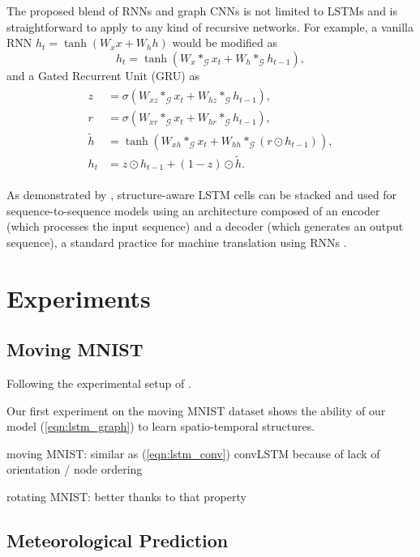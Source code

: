 \documentclass{article} %
\newcommand{\G}{\mathcal{G}}
\newcommand{\eqnref}[1]{(\ref{eqn:#1})}
\begin{document}
The proposed blend of RNNs and graph CNNs is not limited to LSTMs and is
straightforward to apply to any kind of recursive networks. For example, a
vanilla RNN $h_t = \tanh(W_x x + W_h h)$ would be modified as
\begin{equation} \label{eqn:vrnn_graph}
	h_t = \tanh(W_x \ast_\G x_t + W_h \ast_\G h_{t-1}),
\end{equation}
and a Gated Recurrent Unit (GRU) \citep{gru} as
\begin{align} \label{eqn:gru_graph}
\begin{split}
	z &= \sigma(W_{xz} \ast_\G x_t + W_{hz} \ast_\G h_{t-1}), \\
	r &= \sigma(W_{xr} \ast_\G x_t + W_{hr} \ast_\G h_{t-1}), \\
	\tilde{h} &= \tanh(W_{xh} \ast_\G x_t + W_{hh} \ast_\G (r \odot h_{t-1})), \\
	h_t &= z \odot h_{t-1} + (1-z) \odot \tilde{h}.
\end{split}
\end{align}

As demonstrated by \citet{convlstm}, structure-aware LSTM cells can be stacked
and used for sequence-to-sequence models using an architecture composed of an
encoder (which processes the input sequence) and a decoder (which generates an
output sequence), a standard practice for machine translation using RNNs
\citep{gru, seq2seq}.

\section{Experiments}

\subsection{Moving MNIST}

Following the experimental setup of \citet{convlstm}.

Our first experiment on the moving MNIST dataset \citet{moving_mnist} shows the
ability of our model \eqnref{lstm_graph} to learn spatio-temporal structures.

moving MNIST: similar as \eqnref{lstm_conv} convLSTM because of lack of orientation / node ordering

rotating MNIST: better thanks to that property

\subsection{Meteorological Prediction}
\end{document}
